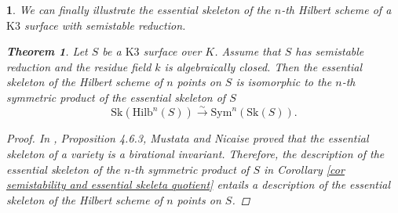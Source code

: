 \documentclass{amsart}%
\numberwithin{equation}{subsection}
\theoremstyle{plain2}
\newtheorem{thm}[equation]{Theorem}
\theoremstyle{definition2}
\theoremstyle{stepstyle}
\theoremstyle{point}
\theoremstyle{subpoint}
\newtheorem{subpoint}[equation]{}%
\newcommand{\spa}[1]{\begin{subpoint}#1\end{subpoint}}           %
\newcommand{\Hilb}{\ensuremath{\mathrm{Hilb}}}
\newcommand{\Sk}{\mathrm{Sk}}
\begin{document}
\spa{We can finally illustrate the essential skeleton of the $n$-th Hilbert scheme of a $\text{K}3$ surface with semistable reduction.
\begin{thm}  \label{thm essential skeleton hilb}
Let $S$ be a $\text{K}3$ surface over $K$. Assume that $S$ has  semistable reduction and the residue field $k$ is algebraically closed. Then the essential skeleton of the Hilbert scheme of $n$ points on $S$ is isomorphic to the $n$-th symmetric product of the essential skeleton of $S$ $$\Sk(\Hilb^n(S)) \xrightarrow{\sim} \text{Sym}^n(\Sk(S)).$$ 
\end{thm}
\begin{proof}
In \cite{MustataNicaise}, Proposition 4.6.3, Mustata and Nicaise proved that the essential skeleton of a variety is a birational invariant. Therefore, the description of the essential skeleton of the $n$-th symmetric product of $S$ in Corollary \ref{cor semistability and essential skeleta quotient} entails a description of the essential skeleton of the Hilbert scheme of $n$ points on $S$.
\end{proof}
}

\end{document}
